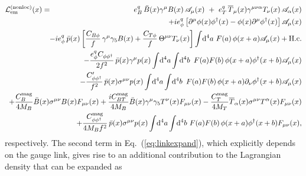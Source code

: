 \documentclass[preprintnumbers,prd,superscriptaddress,preprint]{revtex4-1}
\begin{document}
\begin{eqnarray}
{\cal L}^{\rm (nonloc)}_{\rm em}(x)
&=& e^q_B\, \bar{B}(x) \gamma^\mu B(x)\, \mathscr{A}_\mu(x)\
 +\ e^q_T\, \overline{T}_\mu(x) \gamma^{\mu\nu\alpha} T_\nu(x)\,
	    \mathscr{A}_\alpha(x)
\notag\\
& & \hspace*{-2.3cm}
 + i e^q_\phi \left[ \partial^\mu \phi(x) \phi^\dag(x)
		    - \phi(x) \partial^\mu \phi^\dag(x)
	       \right] \mathscr{A}_\mu(x)
\notag\\
& & \hspace*{-2.3cm}
 - i e^q_\phi\, \bar{p}(x)
    \left[
      \frac{C_{B\phi}}{f}\, \gamma^\mu \gamma_5 B(x)
    + \frac{C_{T\phi}}{f}\, \Theta^{\mu\nu} T_\nu(x)
    \right]
    \int\!\dd[4]{a}\, F(a)\, 
    \phi(x+a) \mathscr{A}_\mu(x) + {\rm H.c.}
\notag\\
& & \hspace*{-2.3cm}
 -  \frac{e^q_\phi C_{\phi\phi^\dag}}{2f^2}\,
    \bar{p}(x) \gamma^\mu p(x)
    \int\!\dd[4]{a} \int\!\dd[4]{b}\ 
    F(a) F(b)\, \phi(x+a) \phi^\dag(x+b)\mathscr{A}_\mu(x)
\notag\\
& & \hspace*{-2.3cm}
 -  \frac{C_{\phi\phi^\dag}'}{f^2}\,
    \bar{p}(x) \sigma^{\mu\nu} p(x) 
    \int\!\dd[4]{a} \int\!\dd[4]{b}\ 
    F(a) F(b)\, \phi(x+a) \partial_\nu\phi^\dag(x+b) \mathscr{A}_\mu(x)
\notag\\
& & \hspace*{-2.3cm}
 +  \frac{C_B^{\rm mag}}{4 M_B}
    \bar B(x) \sigma^{\mu\nu} B(x) F_{\mu\nu}(x)
 +  \frac{i C_{BT}^{\rm mag}}{4 M_B}
    \bar B(x) \gamma^\mu\gamma_5 T^\nu (x) F_{\mu\nu}(x)	
 -  \frac{C_T^{\rm mag}}{4 M_T}
    \overline T_\alpha(x) \sigma^{\mu\nu} T^\alpha(x) F_{\mu\nu}(x)	
\notag\\
& & \hspace*{-2.3cm}
 +  \frac{C_{\phi\phi^\dag}^{\rm mag}}{4 M_B f^2}\,
    \bar{p}(x) \sigma^{\mu\nu} p(x) \int\!\dd[4]{a} \int\!\dd[4]{b}\,
    F(a) F(b)\, \phi(x+a) \phi^\dag(x+b) F_{\mu\nu}(x),
\label{eq:Lnonloc_em}
\end{eqnarray}
%
respectively.
%
The second term in Eq.~(\ref{eq:linkexpand}), which explicitly depends on the gauge link, gives rise to an additional contribution to the Lagrangian density that can be expanded as
%
\end{document}
